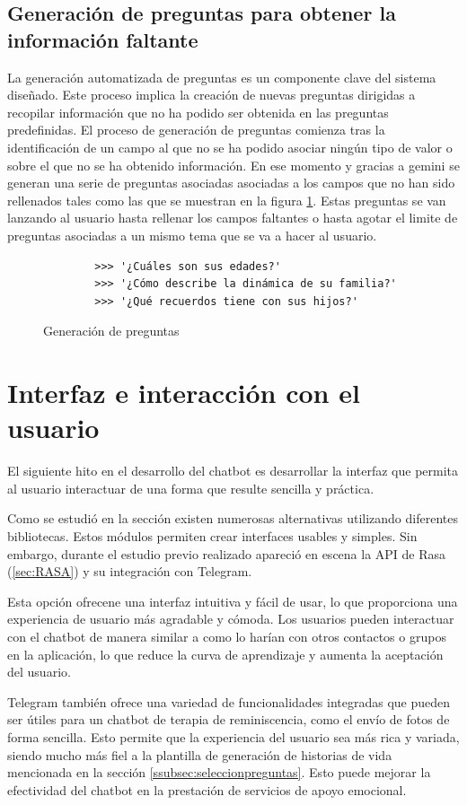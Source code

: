 \subsection{Generación de preguntas para obtener la información faltante}
La generación automatizada de preguntas es un componente clave del sistema diseñado. Este proceso implica la creación de nuevas preguntas dirigidas a recopilar información que no ha podido ser obtenida en las preguntas predefinidas. El proceso de generación de preguntas comienza tras la identificación de un campo al que no se ha podido asociar ningún tipo de valor o sobre el que no se ha obtenido información. En ese momento y gracias a gemini se generan una serie de preguntas asociadas asociadas a los campos que no han sido rellenados tales como las que se muestran en la figura \ref{fig:generacionPreguntas}. Estas preguntas se van lanzando al usuario hasta rellenar los campos faltantes o hasta agotar el limite de preguntas asociadas a un mismo tema que se va a hacer al usuario. 
\begin{figure}[h]
	\centering
	\begin{verbatim}
		>>>	'¿Cuáles son sus edades?'
		>>> '¿Cómo describe la dinámica de su familia?'
		>>> '¿Qué recuerdos tiene con sus hijos?'
	\end{verbatim}
	\caption{Generación de preguntas}
	\label{fig:generacionPreguntas}
\end{figure}
\section{Interfaz e interacción con el usuario}
El siguiente hito en el desarrollo del chatbot es desarrollar la interfaz que permita al usuario interactuar de una forma que resulte sencilla y práctica. 

Como se estudió en la sección \label{sec:estudiointerfaz} existen numerosas alternativas utilizando diferentes bibliotecas. Estos módulos permiten crear interfaces usables y simples. Sin embargo, durante el estudio previo realizado apareció en escena la API de Rasa (\ref{sec:RASA}) y su integración con Telegram. 

Esta opción ofrecene una interfaz intuitiva y fácil de usar, lo que proporciona una experiencia de usuario más agradable y cómoda. Los usuarios pueden interactuar con el chatbot de manera similar a como lo harían con otros contactos o grupos en la aplicación, lo que reduce la curva de aprendizaje y aumenta la aceptación del usuario.

Telegram también ofrece una variedad de funcionalidades integradas que pueden ser útiles para un chatbot de terapia de reminiscencia, como el envío de fotos de forma sencilla. Esto permite que la experiencia del usuario sea más rica y variada, siendo mucho más fiel a la plantilla de generación de historias de vida mencionada en la sección \ref{ssubsec:seleccionpreguntas}. Esto puede mejorar la efectividad del chatbot en la prestación de servicios de apoyo emocional.

